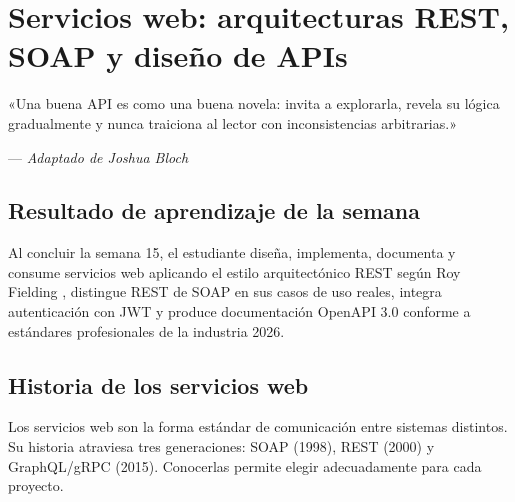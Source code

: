 \chapter{Servicios web: arquitecturas REST, SOAP y diseño de APIs}
\label{cap:semana15}

\epigraph{«Una buena API es como una buena novela: invita a explorarla,
revela su lógica gradualmente y nunca traiciona al lector con
inconsistencias arbitrarias.»}{--- \textit{Adaptado de Joshua Bloch}}

\section*{Resultado de aprendizaje de la semana}
Al concluir la semana 15, el estudiante diseña, implementa, documenta
y consume servicios web aplicando el estilo arquitectónico REST según
Roy Fielding \cite{fielding2000rest}, distingue REST de SOAP en sus
casos de uso reales, integra autenticación con JWT y produce
documentación OpenAPI 3.0 conforme a estándares profesionales de la
industria 2026.

\section{Historia de los servicios web}

Los servicios web son la forma estándar de comunicación
entre sistemas distintos. Su historia atraviesa tres generaciones:
SOAP (1998), REST (2000) y GraphQL/gRPC (2015). Conocerlas permite
elegir adecuadamente para cada proyecto.


